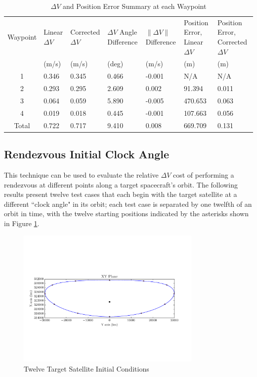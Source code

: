 \documentclass[a4paper]{article}
\begin{document}
\begin{table}[h] 
	\begin{center}
		\begin{tabular}{c p{0.8 cm} p{1.2 cm} p{1 cm} p{1 cm} p{1.3cm} p{1.3cm}}
			\toprule
			Waypoint   & Linear \(\Delta V\) & Corrected \(\Delta V\) & \(\Delta V\)  \mbox{Angle} Difference & \(\|\Delta V \|\) Difference & Position \mbox{Error}, Linear \(\Delta V\) & Position \mbox{Error}, \mbox{Corrected} \(\Delta V\) \\
			   & (m/s) & (m/s) & (deg) & (m/s) & (m) & (m) \\
			\midrule
			1 & 0.346 &	0.345 &	0.466 &	-0.001 &	N/A &	N/A \\
			2 & 0.293 &	0.295 &	2.609 &   0.002 &	91.394 &	0.011 \\
			3 & 0.064 &	0.059 &	5.890 &	-0.005 &	470.653 &	0.063 \\
			4 & 0.019 &	0.018 &	0.445 &	-0.001 &	107.663 &	0.056 \\
			Total & 0.722  & 0.717 & 9.410 & 0.008 & 669.709 & 0.131 \\
			\bottomrule
		\end{tabular}
		\caption{\(\Delta V\) and Position Error Summary at each Waypoint}
		\label{tab:Results_1}
	\end{center}
\end{table}

\afterpage{\clearpage}

\subsection{Rendezvous Initial Clock Angle}

This technique can be used to evaluate the relative \(\Delta V\) cost of performing a rendezvous at different points along a target spacecraft's orbit.  The following results present twelve test cases that each begin with the target satellite at a different ``clock angle" in its orbit; each test case is separated by one twelfth of an orbit in time, with the twelve starting positions indicated by the asterisks shown in Figure \ref{fig:FullOrbit_2}.

\begin{figure}[h] 
	\begin{center}
		\includegraphics[width=0.8\textwidth]{Target_Full_Orbit_2}
		\caption{Twelve Target Satellite Initial Conditions}
		\label{fig:FullOrbit_2}
	\end{center}
\end{figure}
\end{document}
